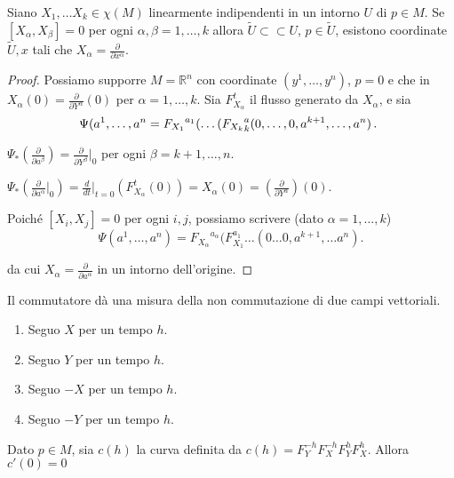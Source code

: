 \begin{proposition}
	Siano $X_1,\dots X_k\in \chi(M)$ linearmente indipendenti in un intorno $U$ di $p\in M$. Se $[X_\alpha,X_\beta]=0$ per ogni $\alpha,\beta=1,\dots ,k$ allora $\tilde{U}\subset\subset U$, $p\in \tilde{U}$, esistono coordinate $\tilde{U},x$ tali che $X_\alpha=\frac{\partial}{\partial x^{\alpha}}$.
\end{proposition}

\begin{proof}
	Possiamo supporre $M=\mathbb{R}^n$ con coordinate $(y^1,\dots, y^n)$, $p=0$ e che in $X_\alpha(0)=\frac{\partial}{\partial Y^\alpha}(0)$ per $\alpha=1,\dots, k$. Sia $F_{X_\alpha}^t$ il flusso generato da $X_\alpha$, e sia 
	\begin{equation*}
		\Psi(a^1,\dots, a^n={F_{X_1}}^{a_1}(\dots ({F_{X_k}}^a_k(0,\dots,0,a^{k+1},\dots, a^n)\, \text{. } 
	\end{equation*}
 
 $\Psi_*(\frac{\partial}{\partial a^{\beta}})=\frac{\partial}{\partial Y^\beta}|_0$ per ogni $\beta=k+1,\dots,n$.
 
 $\Psi_*\left(\frac{\partial}{\partial a^\alpha}|_0\right)=\frac{d}{dt}|_{t=0}\left(F_{X_\alpha}^t(0)\right)=X_\alpha(0)=\left(\frac{\partial}{\partial Y^{\alpha}}\right)(0)$.
 
 Poiché $[X_i,X_j]=0$ per ogni $i,j$, possiamo scrivere (dato $\alpha=1,\dots, k$)
 \[\Psi(a^1,\dots,a^n)={F_{X_\alpha}}^{a_\alpha}(F^{a_1}_{X_1}\dots (0\dots 0, a^{k+1},\dots a^n).\]
 
 da cui $X_{\alpha}=\frac{\partial}{\partial a^{\alpha}}$ in un intorno dell'origine.
\end{proof}

Il commutatore dà una misura della non commutazione di due campi vettoriali.
\begin{enumerate}
 \item Seguo $X$ per un tempo $h$.
 \item Seguo $Y$ per un tempo $h$.
 \item Seguo $-X$ per un tempo $h$.
 \item Seguo $-Y$ per un tempo $h$.
\end{enumerate}


\begin{proposition}
 Dato $p\in M$, sia $c(h)$ la curva definita da $c(h)=F_Y^{-h}F_X^{-h}F_Y^hF_X^h$. Allora $c'(0)=0$
\end{proposition}

